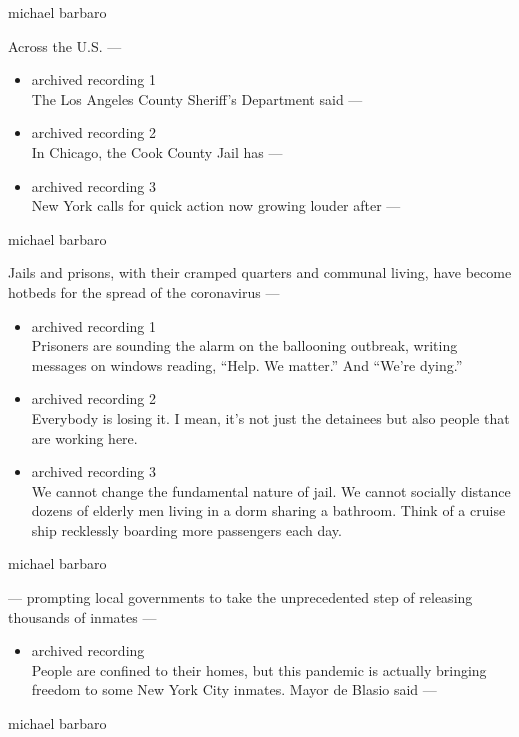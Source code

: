 michael barbaro

Across the U.S. ---

\begin{itemize}
\item
  archived recording 1\\
  The Los Angeles County Sheriff's Department said ---
\item
  archived recording 2\\
  In Chicago, the Cook County Jail has ---
\item
  archived recording 3\\
  New York calls for quick action now growing louder after ---
\end{itemize}

michael barbaro

Jails and prisons, with their cramped quarters and communal living, have
become hotbeds for the spread of the coronavirus ---

\begin{itemize}
\item
  archived recording 1\\
  Prisoners are sounding the alarm on the ballooning outbreak, writing
  messages on windows reading, ``Help. We matter.'' And ``We're dying.''
\item
  archived recording 2\\
  Everybody is losing it. I mean, it's not just the detainees but also
  people that are working here.
\item
  archived recording 3\\
  We cannot change the fundamental nature of jail. We cannot socially
  distance dozens of elderly men living in a dorm sharing a bathroom.
  Think of a cruise ship recklessly boarding more passengers each day.
\end{itemize}

michael barbaro

--- prompting local governments to take the unprecedented step of
releasing thousands of inmates ---

\begin{itemize}
\tightlist
\item
  archived recording\\
  People are confined to their homes, but this pandemic is actually
  bringing freedom to some New York City inmates. Mayor de Blasio said
  ---
\end{itemize}

michael barbaro

